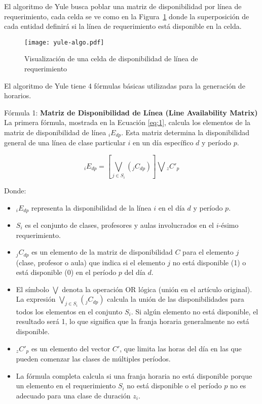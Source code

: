 El algoritmo de Yule busca poblar una matriz de disponibilidad por línea de requerimiento, cada celda se ve como en la Figura~\ref{fig:yuleAlgorithm} donde la superposición de cada entidad definirá si la línea de requerimiento está disponible en la celda.
\begin{figure}[H]
    \centering
    \caption{Visualización de una celda de disponibilidad de línea de requerimiento}
    \texttt{[image: yule-algo.pdf]}
    \label{fig:yuleAlgorithm}
\end{figure}

El algoritmo de Yule tiene 4 fórmulas básicas utilizadas para la generación de horarios.

Fórmula 1: \textbf{Matriz de Disponibilidad de Línea (Line Availability Matrix)} La primera fórmula, mostrada en la Ecuación \ref{eq:1}, calcula los elementos de la matriz de disponibilidad de línea \( _iE_{dp} \).
Esta matriz determina la disponibilidad general de una línea de clase particular \( i \) en un día específico \( d \) y período \( p \).

\begin{equation}
\label{eq:1}
_iE_{dp} = \left[\bigvee_{j \in S_i} (_jC_{dp})\right] \bigvee {}_zC'_{p}
\end{equation}

Donde:
\begin{itemize}
    \item \( _iE_{dp} \) representa la disponibilidad de la línea \( i \) en el día \( d \) y período \( p \).
    \item \( S_i \) es el conjunto de clases, profesores y aulas involucrados en el \( i \)-ésimo requerimiento.
    \item \( _jC_{dp} \) es un elemento de la matriz de disponibilidad \( C \) para el elemento \( j \) (clase, profesor o aula) que indica si el elemento \( j \) no está disponible (1) o está disponible (0) en el período \( p \) del día \( d \).
    \item El símbolo \(\bigvee\) denota la operación OR lógica (unión en el artículo original).
    La expresión \(\bigvee_{j \in S_i} (_jC_{dp})\) calcula la unión de las disponibilidades para todos los elementos en el conjunto \( S_i \).
    Si algún elemento no está disponible, el resultado será 1, lo que significa que la franja horaria generalmente no está disponible.
    \item \( _zC'_{p} \) es un elemento del vector \( C' \), que limita las horas del día en las que pueden comenzar las clases de múltiples períodos.
    \item La fórmula completa calcula si una franja horaria no está disponible porque un elemento en el requerimiento \( S_i \) no está disponible o el período \( p \) no es adecuado para una clase de duración \( z_i \).
\end{itemize}

